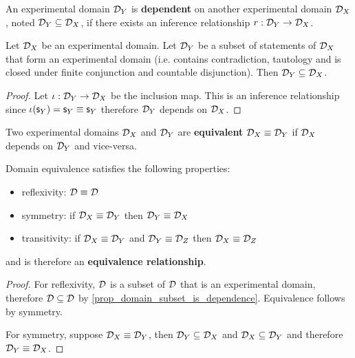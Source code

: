 \documentclass[11pt,letterpaper,fleqn]{memoir} %
\begin{document}
\begin{mathSection}
	\begin{defn}
		An experimental domain $\mathcal{D}_Y$ is \textbf{dependent} on another experimental domain $\mathcal{D}_X$, noted $\mathcal{D}_Y \subseteq \mathcal{D}_X$, if there exists an inference relationship $r: \mathcal{D}_Y \to \mathcal{D}_X$.
	\end{defn}
	\begin{coro}\label{prop_domain_subset_is_dependence}
		Let $\mathcal{D}_X$ be an experimental domain. Let $\mathcal{D}_Y$ be a subset of statements of $\mathcal{D}_X$ that form an experimental domain (i.e. contains contradiction, tautology and is closed under finite conjunction and countable disjunction). Then $\mathcal{D}_Y \subseteq \mathcal{D}_X$.
	\end{coro}
	\begin{proof}
		Let $\iota : \mathcal{D}_Y \to \mathcal{D}_X$ be the inclusion map. This is an inference relationship since $\iota(\mathsf{s}_Y) = \mathsf{s}_Y \equiv \mathsf{s}_Y$ therefore $\mathcal{D}_Y$ depends on $\mathcal{D}_X$.
	\end{proof}
	\begin{defn}
		Two experimental domains $\mathcal{D}_X$ and $\mathcal{D}_Y$ are \textbf{equivalent} $\mathcal{D}_X \equiv \mathcal{D}_Y$ if $\mathcal{D}_X$ depends on $\mathcal{D}_Y$ and vice-versa.
	\end{defn}
	\begin{coro}
		Domain equivalence satisfies the following properties:
		\begin{itemize}
			\item reflexivity: $\mathcal{D} \equiv \mathcal{D}$
			\item symmetry: if $\mathcal{D}_X \equiv \mathcal{D}_Y$ then $\mathcal{D}_Y \equiv \mathcal{D}_X$
			\item transitivity: if $\mathcal{D}_X \equiv \mathcal{D}_Y$ and $\mathcal{D}_Y \equiv \mathcal{D}_Z$ then $\mathcal{D}_X \equiv \mathcal{D}_Z$
		\end{itemize}
		and is therefore an \textbf{equivalence relationship}.
	\end{coro}
	\begin{proof}
		For reflexivity, $\mathcal{D}$ is a subset of $\mathcal{D}$ that is an experimental domain, therefore $\mathcal{D} \subseteq \mathcal{D}$ by \ref{prop_domain_subset_is_dependence}. Equivalence follows by symmetry.
		
		For symmetry, suppose $\mathcal{D}_X \equiv \mathcal{D}_Y$, then $\mathcal{D}_Y \subseteq \mathcal{D}_X$ and $\mathcal{D}_X \subseteq \mathcal{D}_Y$ and therefore $\mathcal{D}_Y \equiv \mathcal{D}_X$.
		

\end{proof}
\end{mathSection}
\end{document}
